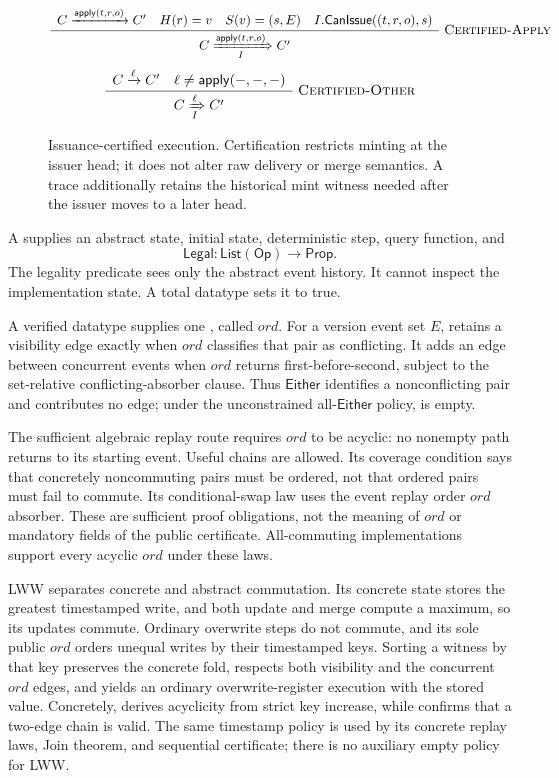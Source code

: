 \begin{figure}[H]
\small
\[
\Rule{Certified-Apply}{
  C\xrightarrow{\mathsf{apply}(t,r,o)}C' \quad H(r)=v
  \quad S(v)=(s,E) \quad I.\mathsf{CanIssue}((t,r,o),s)
}{
  C\xRightarrow[I]{\mathsf{apply}(t,r,o)}C'
}
\]
\[
\Rule{Certified-Other}{
  C\xrightarrow{\ell}C' \quad \ell\ne\mathsf{apply}(-,-,-)
}{
  C\xRightarrow[I]{\ell}C'
}
\]
\caption{Issuance-certified execution. Certification restricts minting at
the issuer head; it does not alter raw delivery or merge semantics. A
 trace additionally retains the historical mint
witness needed after the issuer moves to a later head.}
\label{fig:certified-semantics}
\end{figure}

\begin{definition}
A  supplies an abstract state, initial state,
deterministic step, query function, and
\[
  \mathsf{Legal}:\mathsf{List}(\mathsf{Op})\to\mathsf{Prop}.
\]
The legality predicate sees only the abstract event history. It cannot inspect
the implementation state. A total datatype sets it to true.
\end{definition}

\begin{definition}
A verified datatype supplies one , called $ord$. For a
version event set $E$,  retains a visibility edge exactly when
$ord$ classifies that pair as conflicting. It adds an edge between concurrent
events when $ord$ returns first-before-second, subject to the set-relative
conflicting-absorber clause. Thus $\mathsf{Either}$ identifies a nonconflicting
pair and contributes no edge; under the unconstrained all-$\mathsf{Either}$
policy,  is empty.
\end{definition}

The sufficient algebraic replay route requires $ord$ to be acyclic: no
nonempty  path returns to its starting event. Useful
chains are allowed. Its coverage condition says that concretely noncommuting
pairs must be ordered, not that ordered pairs must fail to commute. Its
conditional-swap law uses the event replay order $ord$ absorber. These are sufficient
proof obligations, not the meaning of $ord$ or mandatory fields of the public
certificate. All-commuting implementations support every acyclic $ord$ under
these laws.

LWW separates concrete and abstract commutation. Its concrete state stores the greatest
timestamped write, and both update and merge compute a maximum, so its updates
commute. Ordinary overwrite steps do not commute, and its sole public $ord$
orders unequal writes by their timestamped keys. Sorting a witness by that key preserves the concrete fold,
respects both visibility and the concurrent $ord$ edges, and yields an ordinary
overwrite-register execution with the stored value. Concretely,
 derives acyclicity from strict key increase, while
 confirms that a two-edge chain is valid. The same
timestamp policy is used by its concrete replay laws, Join theorem, and
sequential certificate; there is no auxiliary empty policy for LWW.

